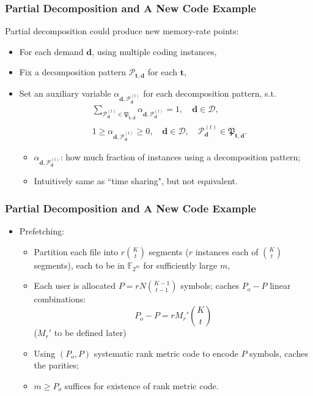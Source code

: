 \documentclass{beamer}
\begin{document}
\begin{frame}
\frametitle{Partial Decomposition and A New Code Example}
Partial decomposition could produce new memory-rate points:
\begin{itemize}
\item For each demand $\boldsymbol{d}$, using multiple coding instances,
\item Fix a decomposition pattern $\mathcal{P}_{\boldsymbol{t},\boldsymbol{d}}$ for each $\boldsymbol{t}$, 
\item Set an auxiliary variable $\alpha_{\boldsymbol{d},\boldsymbol{\mathcal{P}}_{\boldsymbol{d}}^{(t)}}$ for each decomposition pattern, s.t.
\begin{align*}
& \sum_{\boldsymbol{\mathcal{P}}_{\boldsymbol{d}}^{(t)} \in \mathfrak{P}_{\boldsymbol{t},\boldsymbol{d}}}\alpha_{\boldsymbol{d},\boldsymbol{\mathcal{P}}_{\boldsymbol{d}}^{(t)}}=1, \quad \boldsymbol{d} \in \mathcal{D}, \\
& 1 \geq \alpha_{\boldsymbol{d},\boldsymbol{\mathcal{P}}_{\boldsymbol{d}}^{(t)}} \geq 0, \quad \boldsymbol{d} \in \mathcal{D}, \quad \boldsymbol{\mathcal{P}}_{\boldsymbol{d}}^{(t)} \in \mathfrak{P}_{\boldsymbol{t},\boldsymbol{d}}.
\end{align*}
	\begin{itemize}
	[circle]
	\item $\alpha_{\boldsymbol{d},\boldsymbol{\mathcal{P}}_{\boldsymbol{d}}^{(t)}}$: how much fraction of instances using a decomposition pattern;
	\item Intuitively same as ``time sharing", but not equivalent.
	\end{itemize}
\end{itemize}
\end{frame}


\begin{frame}
\frametitle{Partial Decomposition and A New Code Example}
\begin{itemize}
\item Prefetching:
	\begin{itemize}
	[circle]
	\item Partition each file into $r\binom{K}{t}$ segments ($r$ instances each of $\binom{K}{t}$ segments), each to be in $\mathbb{F}_{2^m}$ for sufficiently large $m$,
	\item Each user is allocated $P=rN\binom{K-1}{t-1}$ symbols; caches $P_o-P$ linear combinations:
	\begin{equation*}
	P_o-P=rM_r' \binom{K}{t}
	\end{equation*}
	($M_r'$ to be defined later)
	\item Using $(P_o,P)$ systematic rank metric code to encode $P$ symbols, caches the parities;
	\item $m \geq P_o$ suffices for existence of rank metric code.
	\end{itemize}
\end{itemize}
\end{frame}
\end{document}
